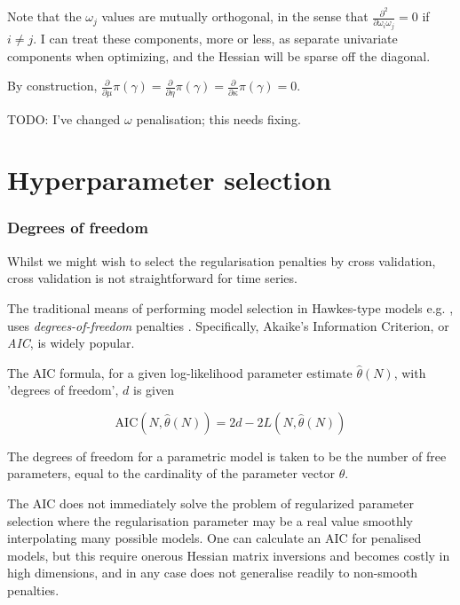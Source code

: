 \documentclass[11pt]{article}
\begin{document}
Note that the \(\omega_j\) values are mutually orthogonal, in the sense
that \({ \scriptstyle \frac{\partial^2}{\partial\omega_i\omega_j}} =0\)
if \(i\ne j\). I can treat these components, more or less, as separate
univariate components when optimizing, and the Hessian will be sparse
off the diagonal.

By construction,
\({ \scriptstyle \frac{\partial}{\partial\mu} }\pi(\gamma) = { \scriptstyle \frac{\partial}{\partial\eta} }\pi(\gamma) = { \scriptstyle \frac{\partial}{\partial\kappa} }\pi(\gamma) = 0\).

TODO: I've changed \(\omega\) penalisation; this needs fixing.

    \section{Hyperparameter selection}\label{hyperparameter-selection}

    \subsubsection{Degrees of freedom}\label{degrees-of-freedom}

Whilst we might wish to select the regularisation penalties by cross
validation, cross validation is not straightforward for time series.

The traditional means of performing model selection in Hawkes-type
models e.g. \cite{ogata_estimation_1983}, uses \emph{degrees-of-freedom}
penalties \cite{efron_how_1986}. Specifically, Akaike's
\cite{akaike_likelihood_1981} Information Criterion, or \emph{AIC}, is
widely popular.

The AIC formula, for a given log-likelihood parameter estimate
\(\hat{\theta}(N)\), with 'degrees of freedom', \(d\) is given

\[\mathrm{AIC}(N,\hat{\theta}(N))=2d-2L(N,\hat{\theta}(N))\]

The degrees of freedom for a parametric model is taken to be the number
of free parameters, equal to the cardinality of the parameter vector
\(\theta\).

    The AIC does not immediately solve the problem of regularized parameter
selection where the regularisation parameter may be a real value
smoothly interpolating many possible models. One can calculate an AIC
for penalised models, but this require onerous Hessian matrix inversions
and becomes costly in high dimensions, and in any case does not
generalise readily to non-smooth penalties.
\cite{konishi_information_2008}
\end{document}
